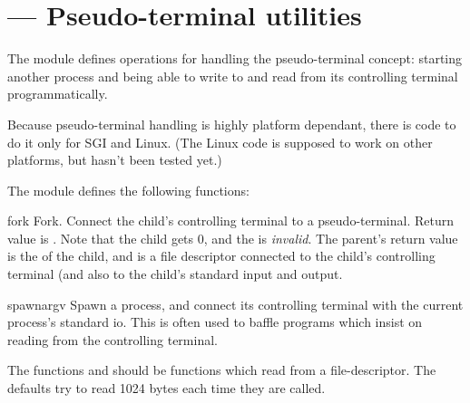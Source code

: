 \section{ ---
         Pseudo-terminal utilities}


The  module defines operations for handling the
pseudo-terminal concept: starting another process and being able to
write to and read from its controlling terminal programmatically.

Because pseudo-terminal handling is highly platform dependant, there
is code to do it only for SGI and Linux. (The Linux code is supposed
to work on other platforms, but hasn't been tested yet.)

The  module defines the following functions:

\begin{funcdesc}{fork}{}
Fork. Connect the child's controlling terminal to a pseudo-terminal.
Return value is . Note that the child 
gets  0, and the  is \emph{invalid}. The parent's
return value is the  of the child, and  is a file
descriptor connected to the child's controlling terminal (and also
to the child's standard input and output.
\end{funcdesc}

\begin{funcdesc}{spawn}{argv}
Spawn a process, and connect its controlling terminal with the current 
process's standard io. This is often used to baffle programs which
insist on reading from the controlling terminal.

The functions  and  should be
functions which read from a file-descriptor. The defaults try to read
1024 bytes each time they are called.
\end{funcdesc}
